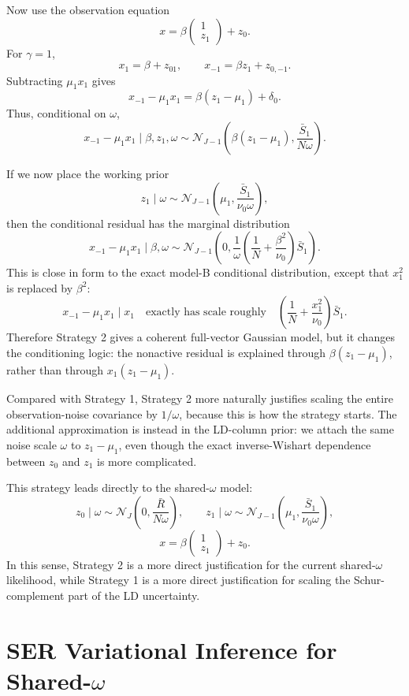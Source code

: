 \documentclass[11pt]{article}
\newcommand{\Rbar}{\bar R}
\newcommand{\Normal}{\mathcal N}
\begin{document}
Now use the observation equation
\[
x=
\beta
\begin{pmatrix}
1\\ z_1
\end{pmatrix}
+z_0.
\]
For \(\gamma=1\),
\[
x_1=\beta+z_{01},
\qquad
x_{-1}=\beta z_1+z_{0,-1}.
\]
Subtracting \(\mu_1x_1\) gives
\[
x_{-1}-\mu_1x_1
=
\beta(z_1-\mu_1)+\delta_0.
\]
Thus, conditional on \(\omega\),
\[
x_{-1}-\mu_1x_1
\mid \beta,z_1,\omega
\sim
\Normal_{J-1}\left(
\beta(z_1-\mu_1),
\frac{\bar S_1}{N\omega}
\right).
\]

If we now place the working prior
\[
z_1\mid\omega
\sim
\Normal_{J-1}\left(
\mu_1,\frac{\bar S_1}{\nu_0\omega}
\right),
\]
then the conditional residual has the marginal distribution
\[
x_{-1}-\mu_1x_1
\mid \beta,\omega
\sim
\Normal_{J-1}\left(
0,
\frac{1}{\omega}
\left(\frac1N+\frac{\beta^2}{\nu_0}\right)\bar S_1
\right).
\]
This is close in form to the exact model-B conditional distribution, except
that \(x_1^2\) is replaced by \(\beta^2\):
\[
x_{-1}-\mu_1x_1
\mid x_1
\quad\text{exactly has scale roughly}\quad
\left(\frac1N+\frac{x_1^2}{\nu_0}\right)\bar S_1.
\]
Therefore Strategy 2 gives a coherent full-vector Gaussian model, but it
changes the conditioning logic: the nonactive residual is explained through
\(\beta(z_1-\mu_1)\), rather than through \(x_1(z_1-\mu_1)\).

Compared with Strategy 1, Strategy 2 more naturally justifies scaling the
entire observation-noise covariance by \(1/\omega\), because this is how the
strategy starts. The additional approximation is instead in the LD-column
prior: we attach the same noise scale \(\omega\) to \(z_1-\mu_1\), even though
the exact inverse-Wishart dependence between \(z_0\) and \(z_1\) is more
complicated.

This strategy leads directly to the shared-\(\omega\) model:
\[
z_0\mid\omega
\sim
\Normal_J\left(0,\frac{\Rbar}{N\omega}\right),
\qquad
z_1\mid\omega
\sim
\Normal_{J-1}\left(
\mu_1,\frac{\bar S_1}{\nu_0\omega}
\right),
\]
\[
x=\beta
\begin{pmatrix}
1\\z_1
\end{pmatrix}
+z_0.
\]
In this sense, Strategy 2 is a more direct justification for the current
shared-\(\omega\) likelihood, while Strategy 1 is a more direct justification
for scaling the Schur-complement part of the LD uncertainty.


\section{SER Variational Inference for Shared-\texorpdfstring{\(\omega\)}{omega}}
\end{document}
